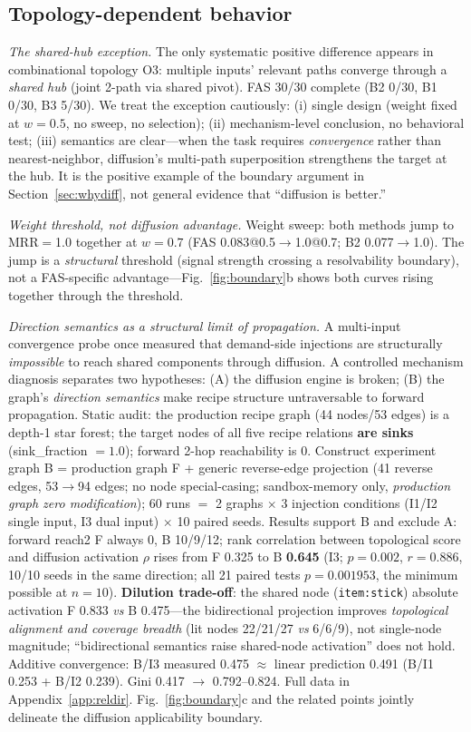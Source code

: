 \documentclass[10pt,a4paper]{article}
\begin{document}
\subsection{Topology-dependent behavior}
\label{sec:res-topo}
\emph{The shared-hub exception.} The only systematic positive difference appears in combinational topology O3: multiple inputs' relevant paths converge through a \emph{shared hub} (joint 2-path via shared pivot). FAS 30/30 complete (B2 0/30, B1 0/30, B3 5/30). We treat the exception cautiously: (i) single design (weight fixed at $w{=}0.5$, no sweep, no selection); (ii) mechanism-level conclusion, no behavioral test; (iii) semantics are clear---when the task requires \emph{convergence} rather than nearest-neighbor, diffusion's multi-path superposition strengthens the target at the hub. It is the positive example of the boundary argument in Section~\ref{sec:whydiff}, not general evidence that ``diffusion is better.''

\emph{Weight threshold, not diffusion advantage.} Weight sweep: both methods jump to MRR$=$1.0 together at $w{=}0.7$ (FAS 0.083@0.5$\rightarrow$1.0@0.7; B2 0.077$\rightarrow$1.0). The jump is a \emph{structural} threshold (signal strength crossing a resolvability boundary), not a FAS-specific advantage---Fig.~\ref{fig:boundary}b shows both curves rising together through the threshold.

\emph{Direction semantics as a structural limit of propagation.} A multi-input convergence probe once measured that demand-side injections are structurally \emph{impossible} to reach shared components through diffusion. A controlled mechanism diagnosis separates two hypotheses: (A) the diffusion engine is broken; (B) the graph's \emph{direction semantics} make recipe structure untraversable to forward propagation. Static audit: the production recipe graph (44 nodes/53 edges) is a depth-1 star forest; the target nodes of all five recipe relations \textbf{are sinks} (sink\_fraction $=1.0$); forward 2-hop reachability is 0. Construct experiment graph B = production graph F + generic reverse-edge projection (41 reverse edges, 53$\rightarrow$94 edges; no node special-casing; sandbox-memory only, \emph{production graph zero modification}); 60 runs $=$ 2 graphs $\times$ 3 injection conditions (I1/I2 single input, I3 dual input) $\times$ 10 paired seeds. Results support B and exclude A: forward reach2 F always 0, B 10/9/12; rank correlation between topological score and diffusion activation $\rho$ rises from F 0.325 to B \textbf{0.645} (I3; $p{=}0.002$, $r{=}0.886$, 10/10 seeds in the same direction; all 21 paired tests $p{=}0.001953$, the minimum possible at $n{=}10$). \textbf{Dilution trade-off}: the shared node (\texttt{item:stick}) absolute activation F 0.833 \emph{vs} B 0.475---the bidirectional projection improves \emph{topological alignment and coverage breadth} (lit nodes 22/21/27 \emph{vs} 6/6/9), not single-node magnitude; ``bidirectional semantics raise shared-node activation'' does not hold. Additive convergence: B/I3 measured 0.475 $\approx$ linear prediction 0.491 (B/I1 0.253 + B/I2 0.239). Gini 0.417 $\rightarrow$ 0.792--0.824. Full data in Appendix~\ref{app:reldir}. Fig.~\ref{fig:boundary}c and the related points jointly delineate the diffusion applicability boundary.
\end{document}

